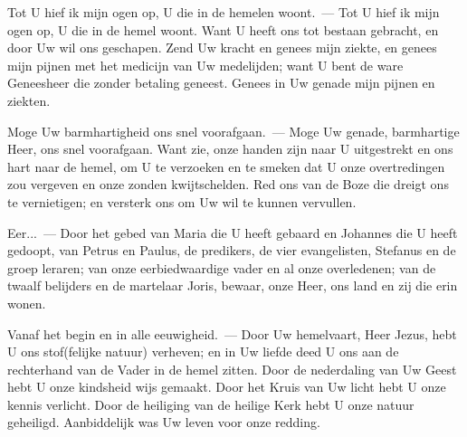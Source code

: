 \documentclass[12pt,twoside,a5paper]{article}
\begin{document}
\begin{halfparskip}
  Tot U hief ik mijn ogen op, U die in de hemelen woont.~--- Tot U hief ik mijn ogen op, U die in de hemel woont. Want U heeft ons tot bestaan gebracht, en door Uw wil ons geschapen. Zend Uw kracht en genees mijn ziekte, en genees mijn pijnen met het medicijn van Uw medelijden; want U bent de ware Geneesheer die zonder betaling geneest. Genees in Uw genade mijn pijnen en ziekten.

  Moge Uw barmhartigheid ons snel voorafgaan.~--- Moge Uw genade, barmhartige Heer, ons snel voorafgaan. Want zie, onze handen zijn naar U uitgestrekt en ons hart naar de hemel, om U te verzoeken en te smeken dat U onze overtredingen zou vergeven en onze zonden kwijtschelden. Red ons van de Boze die dreigt ons te vernietigen; en versterk ons om Uw wil te kunnen vervullen.

  Eer...~--- Door het gebed van Maria die U heeft gebaard en Johannes die U heeft gedoopt, van Petrus en Paulus, de predikers, de vier evangelisten, Stefanus en de groep leraren; van onze eerbiedwaardige vader en al onze overledenen; van de twaalf belijders en de martelaar Joris, bewaar, onze Heer, ons land en zij die erin wonen.

  Vanaf het begin en in alle eeuwigheid.~--- Door Uw hemelvaart, Heer Jezus, hebt U ons stof(felijke natuur) verheven; en in Uw liefde deed U ons aan de rechterhand van de Vader in de hemel zitten. Door de nederdaling van Uw Geest hebt U onze kindsheid wijs gemaakt. Door het Kruis van Uw licht hebt U onze kennis verlicht. Door de heiliging van de heilige Kerk hebt U onze natuur geheiligd. Aanbiddelijk was Uw leven voor onze
  redding.
\end{halfparskip}

\end{document}

